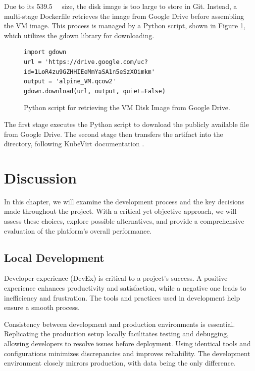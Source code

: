 Due to its \SI{539,5}{\mega\byte} size, the disk image is too large to store in Git. Instead, a multi-stage Dockerfile retrieves the image from Google Drive before assembling the VM image. This process is managed by a Python script, shown in Figure \ref{fig:python_script_vm_image}, which utilizes the gdown library for downloading.

\begin{figure}[h]
    \centering
\begin{verbatim}
import gdown
url = 'https://drive.google.com/uc?id=1LoR4zu9GZHHIEeMmYaSA1n5eSzXOimkm'
output = 'alpine_VM.qcow2'
gdown.download(url, output, quiet=False)
\end{verbatim}
    \caption{Python script for retrieving the VM Disk Image from Google Drive.}
    \label{fig:python_script_vm_image}
\end{figure}

The first stage executes the Python script to download the publicly available file from Google Drive. The second stage then transfers the artifact into the  directory, following KubeVirt documentation \parencite{kubevirt_disk_image}.

\chapter{Discussion}
In this chapter, we will examine the development process and the key decisions made throughout the project. With a critical yet objective approach, we will assess these choices, explore possible alternatives, and provide a comprehensive evaluation of the platform's overall performance.

\section{Local Development}
Developer experience (DevEx) is critical to a project's success. A positive experience enhances productivity and satisfaction, while a negative one leads to inefficiency and frustration. The tools and practices used in development help ensure a smooth process.

Consistency between development and production environments is essential. Replicating the production setup locally facilitates testing and debugging, allowing developers to resolve issues before deployment. Using identical tools and configurations minimizes discrepancies and improves reliability. The development environment closely mirrors production, with data being the only difference.

